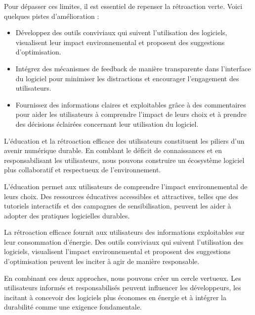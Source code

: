 Pour dépasser ces limites, il est essentiel de repenser la rétroaction verte. Voici quelques pistes d'amélioration :
\begin{itemize}
    \item Développez des outils conviviaux qui suivent l’utilisation des logiciels, visualisent leur impact environnemental et proposent des suggestions d’optimisation.
    \item Intégrez des mécanismes de feedback de manière transparente dans l'interface du logiciel pour minimiser les distractions et encourager l'engagement des utilisateurs.
    \item Fournissez des informations claires et exploitables grâce à des commentaires pour aider les utilisateurs à comprendre l'impact de leurs choix et à prendre des décisions éclairées concernant leur utilisation du logiciel.
\end{itemize}


L'éducation et la rétroaction efficace des utilisateurs constituent les piliers d'un avenir numérique durable. En comblant le déficit de connaissances et en responsabilisant les utilisateurs, nous pouvons construire un écosystème logiciel plus collaboratif et respectueux de l'environnement.


L'éducation permet aux utilisateurs de comprendre l'impact environnemental de leurs choix. Des ressources éducatives accessibles et attractives, telles que des tutoriels interactifs et des campagnes de sensibilisation, peuvent les aider à adopter des pratiques logicielles durables.


La rétroaction efficace fournit aux utilisateurs des informations exploitables sur leur consommation d'énergie. Des outils conviviaux qui suivent l'utilisation des logiciels, visualisent l'impact environnemental et proposent des suggestions d'optimisation peuvent les inciter à agir de manière responsable.


En combinant ces deux approches, nous pouvons créer un cercle vertueux. Les utilisateurs informés et responsabilisés peuvent influencer les développeurs, les incitant à concevoir des logiciels plus économes en énergie et à intégrer la durabilité comme une exigence fondamentale.


